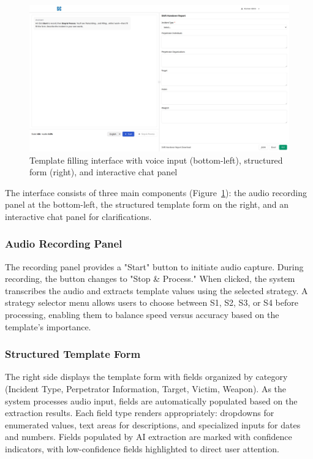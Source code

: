 \begin{figure}[H]
  \centering
  \includegraphics[width=1.0\linewidth]{images/template_interface.png}
  \caption{Template filling interface with voice input (bottom-left), structured form (right), and interactive chat panel}
  \label{fig:template-interface}
\end{figure}

The interface consists of three main components (Figure~\ref{fig:template-interface}): the audio recording panel at the bottom-left, the structured template form on the right, and an interactive chat panel for clarifications.

\subsubsection{Audio Recording Panel}

The recording panel provides a "Start" button to initiate audio capture. During recording, the button changes to "Stop \& Process." When clicked, the system transcribes the audio and extracts template values using the selected strategy. A strategy selector menu allows users to choose between S1, S2, S3, or S4 before processing, enabling them to balance speed versus accuracy based on the template's importance.

\subsubsection{Structured Template Form}

The right side displays the template form with fields organized by category (Incident Type, Perpetrator Information, Target, Victim, Weapon). As the system processes audio input, fields are automatically populated based on the extraction results. Each field type renders appropriately: dropdowns for enumerated values, text areas for descriptions, and specialized inputs for dates and numbers. Fields populated by AI extraction are marked with confidence indicators, with low-confidence fields highlighted to direct user attention.


